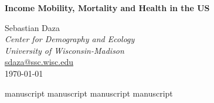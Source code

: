 \documentclass[12pt]{report}
\begin{document}

\thispagestyle{empty}

\renewcommand{\baselinestretch}{1}

\vspace*{110pt}

\begin{center}
\LARGE \textbf{Income Mobility, Mortality and Health in the US} \\
\bigskip


\end{center}

\begin{center}
\normalsize
Sebastian Daza \\
\textit{Center for Demography and Ecology \\University of Wisconsin-Madison}\\
\url{sdaza@ssc.wisc.edu}\\
\bigskip
\bigskip
\today \\
\bigskip
\bigskip
\end{center}

\newpage
{}
\setcounter{page}{1}
\tableofcontents
\listoftables
\listoffigures

\newpage


\clearpage
{}
\setcounter{page}{1}


\newpage

{manuscript}
{manuscript}
{manuscript}
{manuscript}


\clearpage
\singlespacing
\setlength\parskip{12pt}




\end{document}
